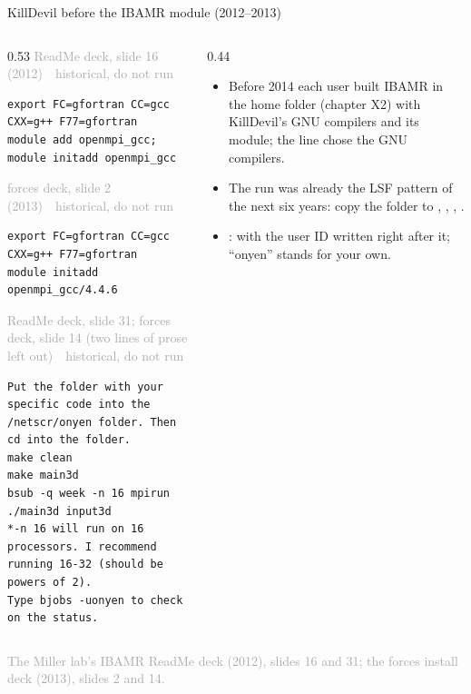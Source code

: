 \documentclass[aspectratio=169,11pt]{beamer}
\newcommand{\sourcecredit}[1]{\vfill\begin{flushright}\tiny\textcolor{DarkGray}{#1}\end{flushright}}
\newcommand{\hist}[1]{{\tiny\sffamily\textcolor{DarkGray}{#1\ \textbullet\ historical, do not run}}\par\nointerlineskip\vspace{0.3mm}}
\begin{document}
\begin{frame}[fragile]{KillDevil before the IBAMR module (2012--2013)}
\label{fr:kdearly}
\begin{columns}[T,onlytextwidth]
\begin{column}{0.53\textwidth}
\hist{ReadMe deck, slide 16 (2012)}
\begin{lstlisting}[style=hist]
export FC=gfortran CC=gcc CXX=g++ F77=gfortran
module add openmpi_gcc; module initadd openmpi_gcc
\end{lstlisting}
\hist{forces deck, slide 2 (2013)}
\begin{lstlisting}[style=hist]
export FC=gfortran CC=gcc CXX=g++ F77=gfortran
module initadd openmpi_gcc/4.4.6
\end{lstlisting}
\hist{ReadMe deck, slide 31; forces deck, slide 14 (two lines of prose left out)}
\begin{lstlisting}[style=hist]
Put the folder with your specific code into the /netscr/onyen folder. Then cd into the folder.
make clean
make main3d
bsub -q week -n 16 mpirun ./main3d input3d
*-n 16 will run on 16 processors. I recommend running 16-32 (should be powers of 2).
Type bjobs -uonyen to check on the status.
\end{lstlisting}
\end{column}
\begin{column}{0.44\textwidth}
\footnotesize
\begin{itemize}\setlength{\itemsep}{2pt}
  \item Before 2014 each user built IBAMR in the home folder (chapter X2) with KillDevil's GNU compilers and its  module; the  line chose the GNU compilers.
  \item The run was already the LSF pattern of the next six years: copy the folder to , , , .
  \item {}:  with the user ID written right after it; ``onyen'' stands for your own.
\end{itemize}
\end{column}
\end{columns}
\sourcecredit{The Miller lab's IBAMR ReadMe deck (2012), slides 16 and 31; the forces install deck (2013), slides 2 and 14.}
\end{frame}
\end{document}
